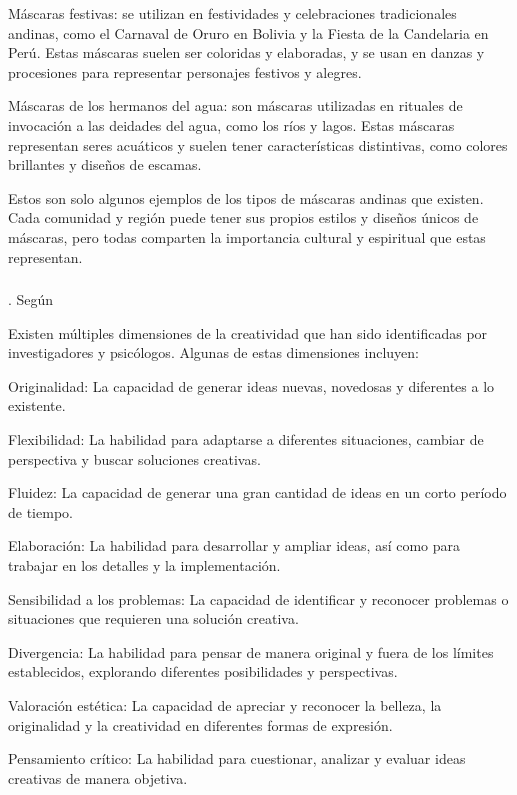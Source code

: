 \documentclass[12pt,a4paper]{article}
\begin{document}
	Máscaras festivas: se utilizan en festividades y celebraciones tradicionales andinas, como el Carnaval de Oruro en Bolivia y la Fiesta de la Candelaria en Perú. Estas máscaras suelen ser coloridas y elaboradas, y se usan en danzas y procesiones para representar personajes festivos y alegres.

	Máscaras de los hermanos del agua: son máscaras utilizadas en rituales de invocación a las deidades del agua, como los ríos y lagos. Estas máscaras representan seres acuáticos y suelen tener características distintivas, como colores brillantes y diseños de escamas.

	      Estos son solo algunos ejemplos de los tipos de máscaras andinas que existen. Cada comunidad y región puede tener sus propios estilos y diseños únicos de máscaras, pero todas comparten la importancia cultural y espiritual que estas representan.


\subsubsection{\variabled}. Según %

Existen múltiples dimensiones de la creatividad que han sido identificadas por investigadores y psicólogos. Algunas de estas dimensiones incluyen:

Originalidad: La capacidad de generar ideas nuevas, novedosas y diferentes a lo existente.

Flexibilidad: La habilidad para adaptarse a diferentes situaciones, cambiar de perspectiva y buscar soluciones creativas.

Fluidez: La capacidad de generar una gran cantidad de ideas en un corto período de tiempo.

Elaboración: La habilidad para desarrollar y ampliar ideas, así como para trabajar en los detalles y la implementación.

Sensibilidad a los problemas: La capacidad de identificar y reconocer problemas o situaciones que requieren una solución creativa.

Divergencia: La habilidad para pensar de manera original y fuera de los límites establecidos, explorando diferentes posibilidades y perspectivas.

Valoración estética: La capacidad de apreciar y reconocer la belleza, la originalidad y la creatividad en diferentes formas de expresión.

Pensamiento crítico: La habilidad para cuestionar, analizar y evaluar ideas creativas de manera objetiva.
\end{document}
